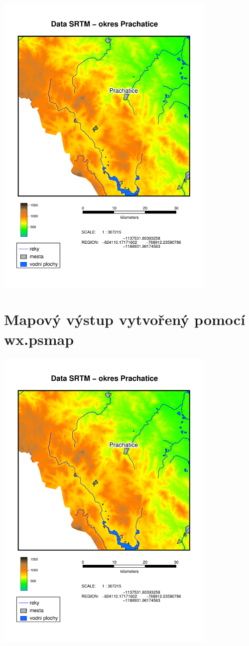 \documentclass[a4paper,12pt,draft]{article}
\begin{document}
\begin{center}
 \includegraphics[width=0.8\textwidth]{./map_vystupy/psmap/dem_srtm.pdf}
\end{center}

\else
\section{Mapový výstup vytvořený pomocí wx.psmap}
\label{priloha:vystupy:psmap}
\centering
\includegraphics[width=0.8\textwidth]{./map_vystupy/psmap/dem_srtm.pdf}
\fi
\end{document}
